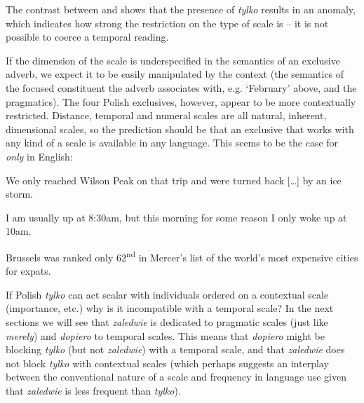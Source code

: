 \documentclass[output=paper,colorlinks,citecolor=brown]{langscibook}
\begin{document}
\noindent The contrast between   and  shows that the presence of \textit{tylko} results in an anomaly, which indicates how strong the restriction on the type of scale is -- it is not possible to coerce a temporal reading.

\ea\label{ex:tom:33}
\z 
\z 

\noindent If the dimension of the scale is underspecified in the semantics of an exclusive adverb, we expect it to be easily manipulated by the context (the semantics of the focused constituent the adverb associates with, e.g. `February' above, and the pragmatics). The four Polish exclusives, however, appear to be more contextually restricted. Distance, temporal and numeral scales are all natural, inherent, dimensional scales, so the prediction should be that an exclusive that works with any kind of a scale is available in any language. This seems to be the case for \textit{only} in English:

\ea\label{ex:tom:34}
We only reached Wilson Peak on that trip and were turned back [\dots] by an ice storm.~
\z 

\ea\label{ex:tom:35} I am usually up at 8:30am, but this morning for some reason I only woke up at 10am.
\z 

\ea\label{ex:tom:36} Brussels was ranked only 62\textsuperscript{nd} in Mercer's list of the world's most expensive cities for expats.
\z

\noindent If %
Polish \textit{tylko} can act scalar with individuals ordered on a contextual scale (importance, etc.) why is it incompatible with a temporal scale? In the next sections we will see that \textit{zaledwie} is dedicated to pragmatic scales (just like \textit{merely}) and \textit{dopiero} to temporal scales. This means that \textit{dopiero} might be blocking \textit{tylko} (but not \textit{zaledwie}) with a temporal scale, and that \textit{zaledwie} does not block \textit{tylko} with contextual scales (which perhaps suggests an interplay between the conventional nature of a scale and frequency in language use given that \textit{zaledwie} is less frequent than \textit{tylko}).
\end{document}
